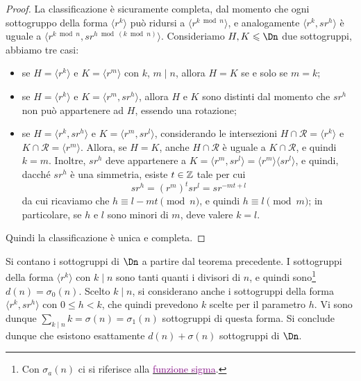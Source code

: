 \documentclass[11pt]{scrartcl}
\begin{document}
	\begin{proof}
		La classificazione è sicuramente completa, dal momento che
		ogni sottogruppo della forma $\langle r^k \rangle$ può ridursi
		a $\langle r^{k \bmod n} \rangle$, e analogamente
		$\langle r^k, sr^h \rangle$ è uguale a
		$\langle r^{k \bmod n}, s r^{h \bmod (k \bmod n)} \rangle$.
		Consideriamo $H, K\leqslant \Dn$ due sottogruppi, abbiamo tre casi:
		\begin{itemize}
			\item se $H = \langle r^k\rangle$ e $K = \langle r^m\rangle$ con $k$, $m \mid n$,
			allora $H = K$ se e solo se $m = k$;
			\item se $H = \langle r^k\rangle$ e $K = \langle r^m, sr^h\rangle$, allora
			$H$ e $K$ sono distinti dal momento che $sr^h$ non può appartenere ad $H$,
			essendo una rotazione;
			\item se $H = \langle r^k, sr^h\rangle$ e $K = \langle r^m, sr^l\rangle$, 
			considerando le intersezioni
			$H \cap \mathcal{R} = \langle r^k\rangle$ e $K \cap \mathcal{R} = \langle r^m\rangle$. Allora, se $H = K$, anche $H \cap \mathcal{R}$ è uguale a
			$K \cap \mathcal{R}$, e quindi $k = m$. Inoltre, $sr^h$ deve appartenere
			a $K = \langle r^m, sr^l \rangle = \langle r^m \rangle \langle sr^l \rangle$,
			e quindi, dacché $sr^h$ è una simmetria, esiste $t \in \mathbb Z$ tale per cui \[
			sr^h = (r^m)^t sr^l = s r^{-mt + l}
			\]da cui ricaviamo che $h \equiv l - mt \pmod{n}$, e quindi
			$h \equiv l \pmod{m}$; in particolare, se $h$ e $l$ sono minori di $m$,
			deve valere $k = l$.
		\end{itemize}
		
		Quindi la classificazione è unica e completa.
	\end{proof}
	
	\begin{remark}
		Si contano i sottogruppi di $\Dn$ a partire dal teorema precedente.
		I sottogruppi della forma $\langle r^k \rangle$
		con $k \mid n$ sono tanti quanti i divisori di $n$, e quindi sono\footnote{
			Con $\sigma_a(n)$ ci si riferisce alla \href{https://it.wikipedia.org/wiki/Funzione_sigma}{\textcolor{purple}{funzione sigma}}.
		} $d(n) = \sigma_0(n)$.
		Scelto $k \mid n$, si considerano anche i sottogruppi della forma
		$\langle r^k, sr^h \rangle$ con $0 \leq h < k$, che quindi prevedono
		$k$ scelte per il parametro $h$. Vi sono dunque $\sum_{k \mid n} k = \sigma(n)  = \sigma_1(n)$
		sottogruppi di questa forma. Si conclude dunque che esistono esattamente
		$d(n) + \sigma(n)$ sottogruppi di $\Dn$.
	\end{remark}
	
\end{document}
